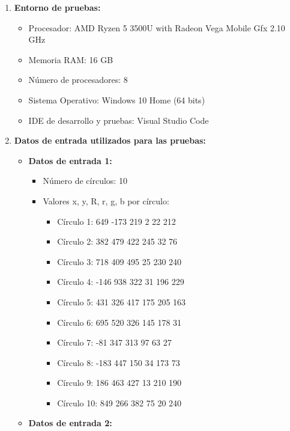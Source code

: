 \documentclass[12pt, letterpaper]{article}
\begin{document}
\begin{flushleft}
\begin{enumerate}
        \vspace{10mm}
        \item \textbf{Entorno de pruebas:}
            \begin{itemize}
                \item Procesador: AMD Ryzen 5 3500U with Radeon Vega Mobile Gfx  2.10 GHz
                \item Memoria RAM: 16 GB
                \item Número de procesadores: 8
                \item Sistema Operativo: Windows 10 Home (64 bits)
                \item IDE de desarrollo y pruebas: Visual Studio Code
            \end{itemize}
        \item \textbf{Datos de entrada utilizados para las pruebas:}
            \begin{itemize}
                \item \textbf{Datos de entrada 1:}
                \begin{itemize}
                    \item Número de círculos: 10
                    \item Valores x, y, R, r, g, b por círculo:
                    \begin{itemize}
                        \item Círculo 1: 649 -173 219 2 22 212
                        \item Círculo 2: 382 479 422 245 32 76
                        \item Círculo 3: 718 409 495 25 230 240
                        \item Círculo 4: -146 938 322 31 196 229
                        \item Círculo 5: 431 326 417 175 205 163
                        \item Círculo 6: 695 520 326 145 178 31
                        \item Círculo 7: -81 347 313 97 63 27
                        \item Círculo 8: -183 447 150 34 173 73
                        \item Círculo 9: 186 463 427 13 210 190
                        \item Círculo 10: 849 266 382 75 20 240
                    \end{itemize}
                \end{itemize}
                \item \textbf{Datos de entrada 2:}

\end{itemize}
\end{enumerate}
\end{flushleft}
\end{document}
